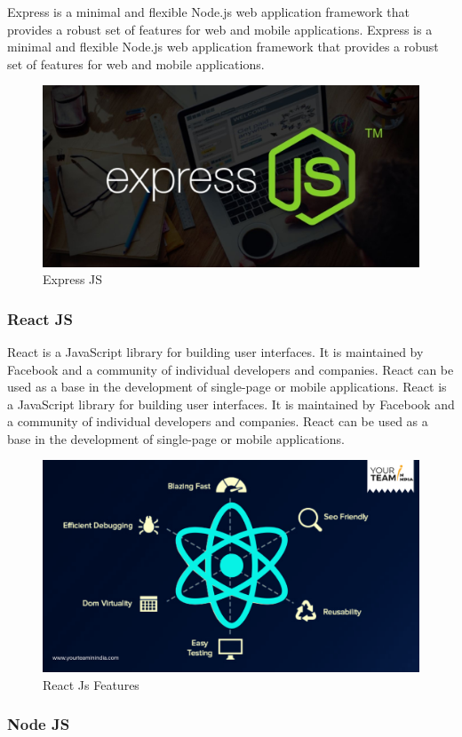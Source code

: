 \documentclass[11pt]{article}
\begin{document}
Express is a minimal and flexible Node.js web application framework that provides a robust set of features for web and mobile applications. Express is a minimal and flexible Node.js web application framework that provides a robust set of features for web and mobile applications.

\begin{figure}[H]
    \centering
    \includegraphics[width=.55\textwidth]{ExpressJS/ExpressJS_7.jpg}
    \caption{Express JS}
\end{figure}

\subsubsection{React JS}

React is a JavaScript library for building user interfaces. It is maintained by Facebook and a community of individual developers and companies. React can be used as a base in the development of single-page or mobile applications. React is a JavaScript library for building user interfaces. It is maintained by Facebook and a community of individual developers and companies. React can be used as a base in the development of single-page or mobile applications.

\begin{figure}[H]
    \centering
    \includegraphics[width=.85\textwidth]{ReactJS/ReactJS_7.jpg}
    \caption{React Js Features}
\end{figure}

\subsubsection{Node JS}
\end{document}
